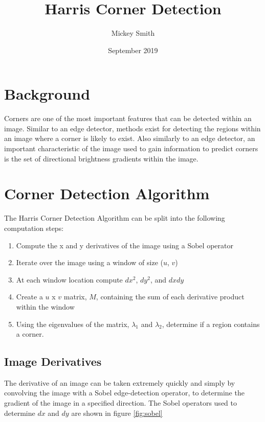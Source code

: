 \documentclass{article}
\title{Harris Corner Detection}
\author{Mickey Smith}
\date{September 2019}
\begin{document}
\maketitle

\section{Background}

Corners are one of the most important features that can be detected within an image. Similar to an edge detector, methods exist for detecting the regions within an image where a corner is likely to exist. Also similarly to an edge detector, an important characteristic of the image used to gain information to predict corners is the set of directional brightness gradients within the image.

\section{Corner Detection Algorithm}

The Harris Corner Detection Algorithm can be split into the following computation steps:

\begin{enumerate}
  \item Compute the x and y derivatives of the image using a Sobel operator
  \item Iterate over the image using a window of size (\( u \), \( v \))
  \item At each window location compute \( dx^{2} \), \( dy^{2} \), and \( dxdy \)
  \item Create a \( u \) x \( v \) matrix, \( M \), containing the sum of each derivative product within the window
  \item Using the eigenvalues of the matrix, \( \lambda_{1} \) and \( \lambda_{2} \), determine if a region contains a corner.
\end{enumerate}

\subsection{Image Derivatives}
The derivative of an image can be taken extremely quickly and simply by convolving the image with a Sobel edge-detection operator, to determine the gradient of the image in a specified direction. The Sobel operators used to determine \( dx \) and \( dy \) are shown in figure \ref{fig:sobel}
\end{document}
